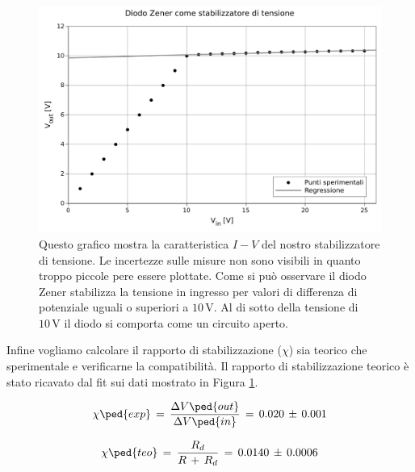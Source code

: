 \begin{figure}
    \includegraphics[scale=0.68]{stab.pdf}
    \caption{Questo grafico mostra la caratteristica $I-V$ del nostro stabilizzatore di tensione. Le incertezze sulle misure non sono visibili in quanto troppo piccole pere essere plottate. Come si può osservare il diodo Zener stabilizza la tensione in ingresso per valori di differenza di potenziale uguali o superiori a $10\,\si{\volt}$. Al di sotto della tensione di $10\,\si{\volt}$ il diodo si comporta come un circuito aperto.}
    \label{fig:stab_tensione}
\end{figure}

Infine vogliamo calcolare il rapporto di stabilizzazione ($\chi$) sia teorico che sperimentale e verificarne la compatibilità.
Il rapporto di stabilizzazione teorico è stato ricavato dal fit sui dati mostrato in Figura \ref{fig:stab_tensione}.

\begin{equation}
	\chi\ped{exp} \,=\, \frac{\Delta V\ped{out}}{\Delta V\ped{in}} \,=\, 0.020\,\pm\,0.001
	\label{eq:c_exp}
\end{equation}

\begin{equation}
	\chi\ped{teo} \,=\, \frac{R_d}{R\,+\,R_d} \,=\, 0.0140\,\pm\,0.0006
	\label{eq:c_teo}
\end{equation}
